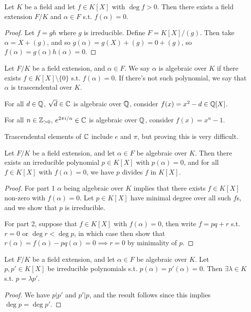 \begin{theorem}
  Let $K$ be a field and let $f\in K[X]$ with $\deg f>0$. Then there exists a field
  extension $F/K$ and $\alpha \in F$ s.t. $f(\alpha)=0$.
\end{theorem}
\begin{proof}
  Let $f=gh$ where $g$ is irreducible. Define $F=K[X]/(g)$. Then take $\alpha=X+(g)$, and
  so $g(\alpha)=g(X)+(g)=0+(g)$, so $f(\alpha)=g(\alpha)h(\alpha)=0$.
\end{proof}

\begin{definition}
  Let $F/K$ be a field extension, and $\alpha\in F$. We say $\alpha$ is algebraic over
  $K$ if there exists $f\in K[X]\setminus \{0\}$ s.t. $f(\alpha)=0$. If there's not such
  polynomial, we say that $\alpha$ is trascendental over $K$.
\end{definition}

\begin{example}
  For all $d\in \mathbb Q$, $\sqrt{d}\in\mathbb C$ is algebraic over $\mathbb Q$, consider
  $f(x)=x^2-d\in\mathbb Q[X]$.

  For all $n\in\mathbb Z_{>0}$, $e^{2\pi i/n}\in \mathbb C$ is algebraic over $\mathbb Q$, consider
  $f(x)=x^n-1$.

  Trascendental elements of $\mathbb C$ include $e$ and $\pi$, but proving this is very
  difficult.
\end{example}

\begin{theorem}
  Let $F/K$ be a field extension, and let $\alpha\in F$ be algebraic over $K$.
  Then there exists an irreducible polynomial $p\in K[X]$ with $p(\alpha)=0$, and for
  all $f\in K[X]$ with $f(\alpha)=0$, we have $p$ divides $f$ in $K[X]$.
\end{theorem}
\begin{proof}
  For part 1 $\alpha$ being algebraic over $K$ implies that there exists $f\in K[X]$
  non-zero with $f(\alpha)=0$. Let $p\in K[X]$ have minimal degree over all such $f$s, and
  we show that $p$ is irreducible.

  For part 2, suppose that $f\in K[X]$ with $f(\alpha)=0$, then write $f=pq+r$ s.t. $r=0$
  or $\deg r <\deg p$, in which case then show that
  $r(\alpha)=f(\alpha)-pq(\alpha)=0\implies r=0$ by minimality of $p$.
\end{proof}


\begin{corollary}
  Let $F/K$ be a field extension, and let $\alpha\in F$ be algebraic over $K$. Let
  $p,p'\in K[X]$ be irreducible polynomials s.t. $p(\alpha)=p'(\alpha)=0$. Then
  $\exists\lambda\in K$ s.t. $p=\lambda p'$.
\end{corollary}
\begin{proof}
  We have $p|p'$ and $p'|p$, and the result follows since this implies $\deg p=\deg p'$.
\end{proof}

